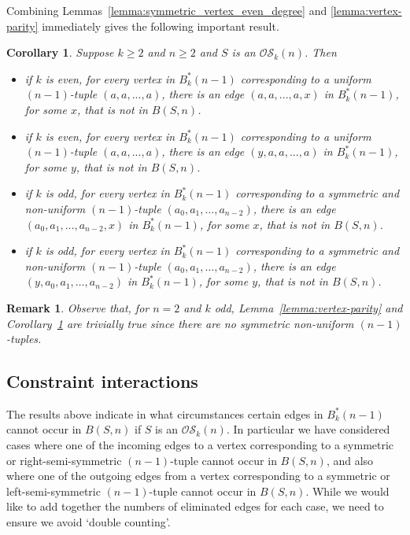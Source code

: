 \documentclass[a4paper,11pt]{article}
\newtheorem{corollary}[lemma]{Corollary}
\newtheorem{remark}[lemma]{Remark}
\begin{document}
Combining Lemmas~\ref{lemma:symmetric_vertex_even_degree} and \ref{lemma:vertex-parity} immediately
gives the following important result.

\begin{corollary}  \label{corollary:excluded-tuples-by-parity}
Suppose $k\geq2$ and $n\geq2$ and $S$ is an $\mathcal{OS}_k(n)$. Then
\begin{itemize}
\item[i)] if $k$ is even, for every vertex in $B^*_k(n-1)$ corresponding to a uniform
    $(n-1)$-tuple $(a,a,...,a)$, there is an edge $(a,a,...,a,x)$ in $B^*_k(n-1)$, for some
    $x$, that is not in $B(S,n)$.
\item[ii)] if $k$ is even, for every vertex in $B^*_k(n-1)$ corresponding to a uniform
    $(n-1)$-tuple $(a,a,...,a)$, there is an edge $(y,a,a,...,a)$ in $B^*_k(n-1)$, for some
    $y$, that is not in $B(S,n)$.
\item[iii)] if $k$ is odd, for every vertex in $B^*_k(n-1)$ corresponding to a symmetric and
    non-uniform $(n-1)$-tuple $(a_0,a_1,\ldots,a_{n-2})$, there is an edge
    $(a_0,a_1,\ldots,a_{n-2},x)$ in $B^*_k(n-1)$, for some $x$, that is not in $B(S,n)$.
\item[iv)] if $k$ is odd, for every vertex in $B^*_k(n-1)$ corresponding to a symmetric and
    non-uniform $(n-1)$-tuple $(a_0,a_1,\ldots,a_{n-2})$, there is an edge
    $(y,a_0,a_1,\ldots,a_{n-2})$ in $B^*_k(n-1)$, for some $y$, that is not in $B(S,n)$.
\end{itemize}
\end{corollary}

\begin{remark}
Observe that, for $n=2$ and $k$ odd, Lemma~\ref{lemma:vertex-parity} and
Corollary~\ref{corollary:excluded-tuples-by-parity} are trivially true since there are no symmetric
non-uniform $(n-1)$-tuples.
\end{remark}

\subsection{Constraint interactions}  \label{subsection:constraint-interactions}

The results above indicate in what circumstances certain edges in $B^*_k(n-1)$ cannot occur in
$B(S,n)$ if $S$ is an $\mathcal{OS}_k(n)$.  In particular we have considered cases where one of the
incoming edges to a vertex corresponding to a symmetric or right-semi-symmetric $(n-1)$-tuple
cannot occur in $B(S,n)$, and also where one of the outgoing edges from a vertex corresponding to a
symmetric or left-semi-symmetric $(n-1)$-tuple cannot occur in $B(S,n)$. While we would like to add
together the numbers of eliminated edges for each case, we need to ensure we avoid `double
counting'.
\end{document}
